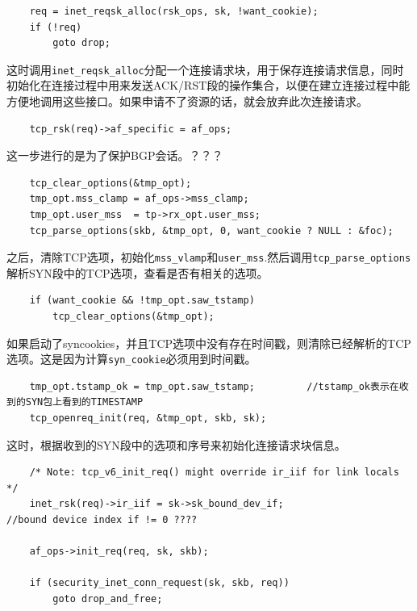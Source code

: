 \begin{verbatim}
    req = inet_reqsk_alloc(rsk_ops, sk, !want_cookie);
    if (!req)
        goto drop;
\end{verbatim}
            
        这时调用\texttt{inet_reqsk_alloc}分配一个连接请求块，用于保存连接请求信息，同时初始化在连接过程中用来发送ACK/RST段的操作集合，以便在建立连接过程中能方便地调用这些接口。如果申请不了资源的话，就会放弃此次连接请求。

\begin{verbatim}
    tcp_rsk(req)->af_specific = af_ops;
\end{verbatim}

        这一步进行的是为了保护BGP会话。？？？
        
\begin{verbatim}
    tcp_clear_options(&tmp_opt);
    tmp_opt.mss_clamp = af_ops->mss_clamp;
    tmp_opt.user_mss  = tp->rx_opt.user_mss;
    tcp_parse_options(skb, &tmp_opt, 0, want_cookie ? NULL : &foc);
\end{verbatim}

        之后，清除TCP选项，初始化\texttt{mss_vlamp}和\texttt{user_mss}.然后调用\texttt{tcp_parse_options}解析SYN段中的TCP选项，查看是否有相关的选项。

\begin{verbatim}
    if (want_cookie && !tmp_opt.saw_tstamp)
        tcp_clear_options(&tmp_opt);
\end{verbatim}

        如果启动了syncookies，并且TCP选项中没有存在时间戳，则清除已经解析的TCP选项。这是因为计算\texttt{syn_cookie}必须用到时间戳。

\begin{verbatim}
    tmp_opt.tstamp_ok = tmp_opt.saw_tstamp;         //tstamp_ok表示在收到的SYN包上看到的TIMESTAMP
    tcp_openreq_init(req, &tmp_opt, skb, sk);
\end{verbatim}

        这时，根据收到的SYN段中的选项和序号来初始化连接请求块信息。

\begin{verbatim}
    /* Note: tcp_v6_init_req() might override ir_iif for link locals */
    inet_rsk(req)->ir_iif = sk->sk_bound_dev_if;                        //bound device index if != 0 ????

    af_ops->init_req(req, sk, skb);

    if (security_inet_conn_request(sk, skb, req))
        goto drop_and_free;
\end{verbatim}

